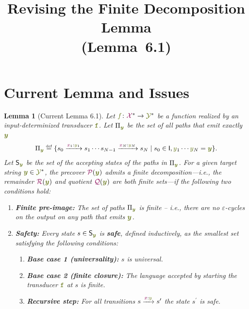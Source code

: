 \documentclass{article}
\title{Revising the Finite Decomposition Lemma\\(Lemma~6.1)}
\author{}
\date{}
\newcommand{\mymacro}[1]{#1}
\newcommand{\defn}[1]{\textbf{#1}}
\newcommand{\defeq}{\mathrel{\overset{\raisebox{-0.25ex}{\textnormal{\tiny def}}}{=}}}
\newcommand{\preCover}{{\color{TokenColor}\mathcal{P}}}
\newcommand{\Quotient}{{\color{TokenColor}\mathcal{Q}}}
\newcommand{\Remainder}{{\color{TokenColor}\mathcal{R}}}
\newcommand{\transFnSym}[0]{f}
\newcommand{\transFn}{\ensuremath{{\color{CharacterColor}\transFnSym}}\xspace}
\newcommand{\srcSym}{{\color{TokenColor}x}}
\newcommand{\tgtSym}{{\color{CharacterColor}y}}
\newcommand{\tgtStr}{{\color{CharacterColor}\boldsymbol{y}}}
\newcommand{\srcAlphabet}[0]{{\color{TokenColor}\ensuremath{\mathcal{X}}}\xspace}
\newcommand{\tgtAlphabet}[0]{{\color{CharacterColor}\ensuremath{\mathcal{Y}}}\xspace}
\newcommand{\srcStrings}[0]{\ensuremath{\srcAlphabet^*}\xspace}
\newcommand{\tgtStrings}[0]{\ensuremath{\tgtAlphabet^*}\xspace}
\newcommand{\transST}{{\color{CharacterColor}\texttt{f}}}
\newcommand{\States}{\mymacro{\mathsf{S}}}
\newcommand{\InitialStates}[0]{\mymacro{\mathsf{I}}}
\newcommand{\state}{\mymacro{s}}
\newcommand{\statep}{\mymacro{s^\prime}}
\newcommand{\Paths}{\mymacro{\Pi}}
\theoremstyle{plain}
\newtheorem{lemma}[theorem]{Lemma}
\begin{document}
\maketitle


\section{Current Lemma and Issues}
\label{sec:current}

\begin{lemma}[Current Lemma 6.1]
\label{lemma:current}
Let $\transFn\colon \srcStrings\to \tgtStrings$ be a function realized by an
input-determinized transducer $\transST$.
Let $\Paths_{\tgtStr}$ be the set of all paths that emit exactly $\tgtStr$
\begin{equation}
\Paths_{\tgtStr} \defeq  \{ \state_0 \xrightarrow{\srcSym_1:\tgtSym_1}\state_1 \cdots \state_{N-1} \xrightarrow{\srcSym_N:\tgtSym_N}\state_N \mid \state_0\in \InitialStates, \tgtSym_1\cdots\tgtSym_N=\tgtStr\}.
\end{equation}
Let $\States_{\tgtStr}$ be the set of the accepting states of the paths in $\Paths_{\tgtStr}$. For a given target string $\tgtStr\in\tgtStrings$, the precover $\preCover(\tgtStr)$ admits a finite decomposition---i.e., the remainder $\Remainder(\tgtStr)$ and quotient $\Quotient(\tgtStr)$ are both finite sets---if the following two conditions hold:
\begin{enumerate}
\item [(i)] \textbf{Finite pre-image:} The set of paths $\Paths_{\tgtStr}$ is finite -- i.e., there are no $\varepsilon$-cycles on the output on any path that emits $\tgtStr$.
\item [(ii)] \textbf{Safety:} Every state $\state\in\States_{\tgtStr}$ is \defn{safe}, defined inductively, as the smallest set satisfying the following conditions:
\begin{enumerate}
\item [(a)] \textbf{Base case 1 (universality):} $\state$ is universal.
\item [(b)] \textbf{Base case 2 (finite closure):} The language accepted by starting the transducer $\transST$ at $\state$ is finite.
\item [(c)] \textbf{Recursive step:} For all transitions $\state\xrightarrow{\srcSym:\tgtSym}\statep$ the state $\statep$ is safe.
\end{enumerate}
\end{enumerate}
\end{lemma}
\end{document}
